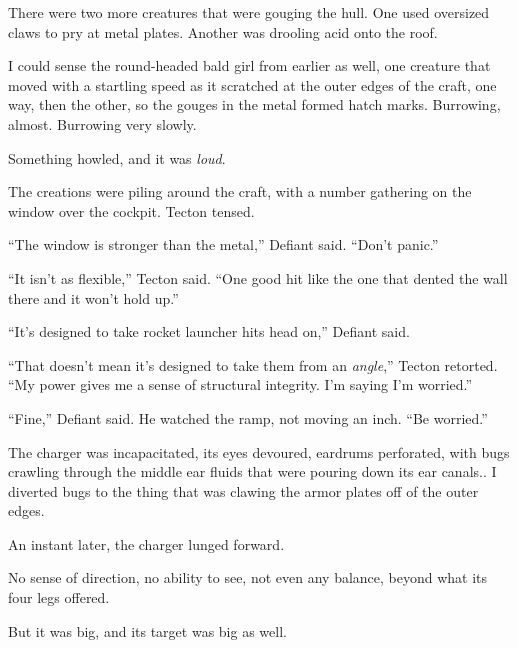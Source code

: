 There were two more creatures that were gouging the hull.  One used oversized claws to pry at metal plates.  Another was drooling acid onto the roof.



I could sense the round-headed bald girl from earlier as well, one creature that moved with a startling speed as it scratched at the outer edges of the craft, one way, then the other, so the gouges in the metal formed hatch marks.  Burrowing, almost.  Burrowing very slowly.



Something howled, and it was \emph{loud}.



The creations were piling around the craft, with a number gathering on the window over the cockpit.  Tecton tensed.



``The window is stronger than the metal,'' Defiant said.  ``Don't panic.''



``It isn't as flexible,'' Tecton said.  ``One good hit like the one that dented the wall there and it won't hold up.''



``It's designed to take rocket launcher hits head on,'' Defiant said.



``That doesn't mean it's designed to take them from an \emph{angle},'' Tecton retorted.  ``My power gives me a sense of structural integrity.  I'm saying I'm worried.''



``Fine,'' Defiant said.  He watched the ramp, not moving an inch.  ``Be worried.''



The charger was incapacitated, its eyes devoured, eardrums perforated, with bugs crawling through the middle ear fluids that were pouring down its ear canals..  I diverted bugs to the thing that was clawing the armor plates off of the outer edges.



An instant later, the charger lunged forward.



No sense of direction, no ability to see, not even any balance, beyond what its four legs offered.



But it was big, and its target was big as well.




